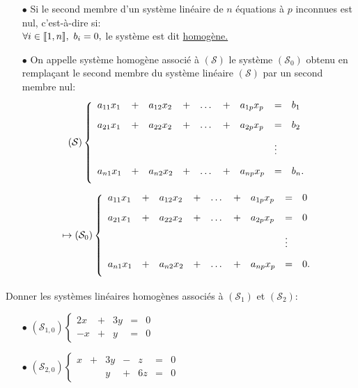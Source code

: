 \documentclass[a4paper, 11pt]{article}
\begin{document}
{\noindent  

\begin{defi}
\begin{itemize}
\item[$\bullet$] Si le second membre d'un syst\`eme lin\'eaire de $n$ \'equations \`a $p$ inconnues est nul, c'est-\`a-dire si:\\ 
\noindent $\forall i\in\llbracket  1,n\rrbracket,\ b_i=0,$
le syst\`eme est dit  \underline{homog\`ene.}
\item[$\bullet$] On appelle syst\`eme homog\`ene associ\'e \`a $(\mathcal{S})$ le syst\`eme $(\mathcal{S}_0)$ obtenu en rempla\c{c}ant le second membre du syst\`eme lin\'eaire $(\mathcal{S})$ par un second membre nul:
$$(\mathcal{S})
\left\lbrace\begin{array}{lllllllll}
a_{11}x_1 & + & a_{12}x_2 & + & \dots & + & a_{1p}x_p & = & b_1\vsec\\
a_{21}x_1 & + & a_{22}x_2 & + & \dots & + & a_{2p}x_p & = & b_2\vsec\\
          &   &            &   &      &    &          & \vdots &   \vsec\\
a_{n1}x_1 & + & a_{n2}x_2 & + & \dots & + & a_{np}x_p & = & b_n.\vsec\\
\end{array}\right.
$$
$$
\mapsto
(\mathcal{S}_0)
\left\lbrace\begin{array}{lllllllll}
a_{11}x_1 & + & a_{12}x_2 & + & \dots & + & a_{1p}x_p & = & 0\vsec\\
a_{21}x_1 & + & a_{22}x_2 & + & \dots & + & a_{2p}x_p & = & 0\vsec\\
          &   &            &   &      &    &          & \vdots &   \vsec\\
a_{n1}x_1 & + & a_{n2}x_2 & + & \dots & + & a_{np}x_p & = & 0.\vsec\\
\end{array}\right.
$$

\end{itemize}
\end{defi}

}


\begin{exemples} Donner les syst\`{e}mes lin\'eaires homog\`{e}nes associ\'es \`{a} $(\mathcal{S}_1)$ et $(\mathcal{S}_2)$: 
\begin{itemize}

\item[$\bullet$] $(\mathcal{S}_{1,0})\left\lbrace\begin{array}{rcrcr}
2x & + & 3y & = & 0\\
-x & + &  y  & = &0
\end{array}\right.$ 
\item[$\bullet$] $(\mathcal{S}_{2,0})\left\lbrace\begin{array}{rcrcrcr}
x&+&3y&-&z&=&0\\
 & &y&+&6z&=&0
\end{array}\right.$ 

\end{itemize}
\end{exemples}
\end{document}
